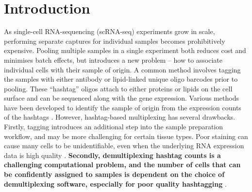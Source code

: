 \documentclass[unnumsec,webpdf,modern,large]{oup-authoring-template}
\begin{document}
	
		\maketitle

		\section{Introduction}
	\label{sec:introduction}
	
	As single-cell RNA-sequencing (scRNA-seq) experiments grow in scale, performing separate captures for individual samples becomes prohibitively expensive. 
	Pooling multiple samples in a single experiment both reduces cost and minimises batch effects, but introduces a new problem – how to associate individual cells with their sample of origin. 
	A common method involves tagging the samples with either antibody or lipid-linked unique oligo barcodes prior to pooling. 
	These ``hashtag'' oligos attach to either proteins
	\citep{Stoeckius2018} 
	or lipids \citep{McGinnis2019}
	on the cell surface and can be sequenced along with the gene expression. Various methods have been developed to identify the sample of origin from the expression counts of the hashtags 
	\citep{Howitt2023}.
	However, hashtag-based multiplexing has several drawbacks. 
	Firstly, tagging introduces an additional step into the sample preparation workflow, and may be more challenging for certain tissue types. 
	Poor staining can cause many cells to be unidentifiable, even when the underlying RNA expression data is high quality 
	\citep{Brown2024}.
	\textbf{Secondly, demultiplexing hashtag counts is a challenging computational problem, and the number of cells that can be confidently assigned to samples is dependent on the choice of demultiplexing software, especially for poor quality hashtagging} 
	\citep{Howitt2023}.
	
\end{document}
